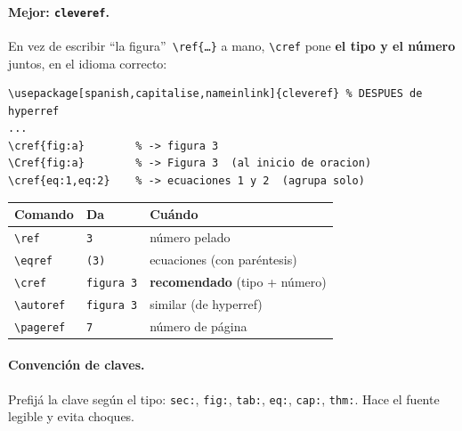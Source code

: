 \documentclass[11pt,a4paper]{article}
\newcommand{\C}[1]{\texttt{\textbackslash #1}}
\newcommand{\pkg}[1]{\textsf{#1}}
\begin{document}
\paragraph{Mejor: \texttt{cleveref}.} En vez de escribir \enquote{la
figura}~\C{ref\{\dots\}} a mano, \C{cref} pone \textbf{el tipo y el número}
juntos, en el idioma correcto:
\begin{lstlisting}
\usepackage[spanish,capitalise,nameinlink]{cleveref} % DESPUES de hyperref
...
\cref{fig:a}        % -> figura 3
\Cref{fig:a}        % -> Figura 3  (al inicio de oracion)
\cref{eq:1,eq:2}    % -> ecuaciones 1 y 2  (agrupa solo)
\end{lstlisting}
\begin{center}\small
\renewcommand{\arraystretch}{1.25}
\begin{tabular}{@{}lll@{}}
\toprule
\textbf{Comando} & \textbf{Da} & \textbf{Cuándo} \\
\midrule
\C{ref}      & \texttt{3}            & número pelado \\
\C{eqref}    & \texttt{(3)}          & ecuaciones (con paréntesis) \\
\C{cref}     & \texttt{figura 3}     & \textbf{recomendado} (tipo + número) \\
\C{autoref}  & \texttt{figura 3}     & similar (de \pkg{hyperref}) \\
\C{pageref}  & \texttt{7}            & número de página \\
\bottomrule
\end{tabular}
\end{center}

\paragraph{Convención de claves.} Prefijá la clave según el tipo: \texttt{sec:},
\texttt{fig:}, \texttt{tab:}, \texttt{eq:}, \texttt{cap:}, \texttt{thm:}. Hace el
fuente legible y evita choques.

\end{document}
